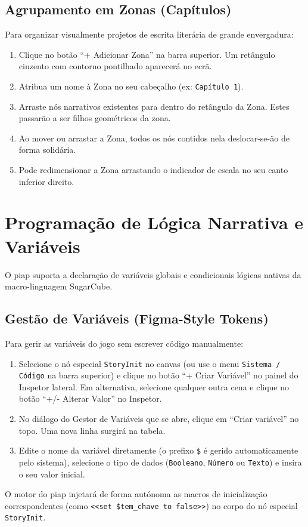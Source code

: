 \subsection{Agrupamento em Zonas (Capítulos)}
Para organizar visualmente projetos de escrita literária de grande envergadura:
\begin{enumerate}
    \item Clique no botão ``+ Adicionar Zona'' na barra superior. Um retângulo cinzento com contorno pontilhado aparecerá no ecrã.
    \item Atribua um nome à Zona no seu cabeçalho (ex: \texttt{Capítulo 1}).
    \item Arraste nós narrativos existentes para dentro do retângulo da Zona. Estes passarão a ser filhos geométricos da zona.
    \item Ao mover ou arrastar a Zona, todos os nós contidos nela deslocar-se-ão de forma solidária.
    \item Pode redimensionar a Zona arrastando o indicador de escala no seu canto inferior direito.
\end{enumerate}

\section{Programação de Lógica Narrativa e Variáveis}
O \gls{piap} suporta a declaração de variáveis globais e condicionais lógicas nativas da macro-linguagem SugarCube.

\subsection{Gestão de Variáveis (Figma-Style Tokens)}
Para gerir as variáveis do jogo sem escrever código manualmente:
\begin{enumerate}
    \item Selecione o nó especial \texttt{StoryInit} no canvas (ou use o menu \texttt{Sistema / Código} na barra superior) e clique no botão ``+ Criar Variável'' no painel do Inspetor lateral. Em alternativa, selecione qualquer outra cena e clique no botão ``+/- Alterar Valor'' no Inspetor.
    \item No diálogo do Gestor de Variáveis que se abre, clique em ``Criar variável'' no topo. Uma nova linha surgirá na tabela.
    \item Edite o nome da variável diretamente (o prefixo \texttt{\$} é gerido automaticamente pelo sistema), selecione o tipo de dados (\texttt{Booleano}, \texttt{Número} ou \texttt{Texto}) e insira o seu valor inicial.
\end{enumerate}
O motor do \gls{piap} injetará de forma autónoma as macros de inicialização correspondentes (como \lstinline|<<set $tem_chave to false>>|) no corpo do nó especial \texttt{StoryInit}.


